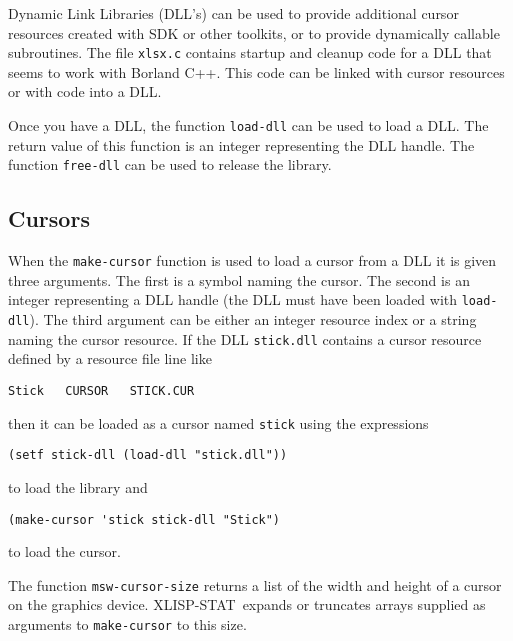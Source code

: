 \documentclass[11pt]{article}
\newcommand{\dcode}[1]{{\tt #1}}
\newcommand{\XLS}{XLISP-STAT}
\begin{document}
Dynamic Link Libraries (DLL's) can be used to provide additional
cursor resources created with SDK or other toolkits, or to provide
dynamically callable subroutines. The file \dcode{xlsx.c} contains
startup and cleanup code for a DLL that seems to work with Borland
C++. This code can be linked with cursor resources or with code into a
DLL.

Once you have a DLL, the function \dcode{load-dll} can be used to load
a DLL. The return value of this function is an integer representing
the DLL handle. The function \dcode{free-dll} can be used to release
the library.

\subsection{Cursors}
When the \dcode{make-cursor} function is used to load a cursor from a
DLL it is given three arguments. The first is a symbol naming the
cursor.  The second is an integer representing a DLL handle (the DLL
must have been loaded with \dcode{load-dll}). The third argument can
be either an integer resource index or a string naming the cursor
resource. If the DLL \dcode{stick.dll} contains a cursor resource
defined by a resource file line like
\begin{verbatim}
Stick   CURSOR   STICK.CUR
\end{verbatim}
then it can be loaded as a cursor named \dcode{stick} using the
expressions
\begin{verbatim}
(setf stick-dll (load-dll "stick.dll"))
\end{verbatim}
to load the library and
\begin{verbatim}
(make-cursor 'stick stick-dll "Stick")
\end{verbatim}
to load the cursor.

The function \dcode{msw-cursor-size} returns a list of the width and
height of a cursor on the graphics device. \XLS\ expands or truncates
arrays supplied as arguments to \dcode{make-cursor} to this size.
\end{document}
